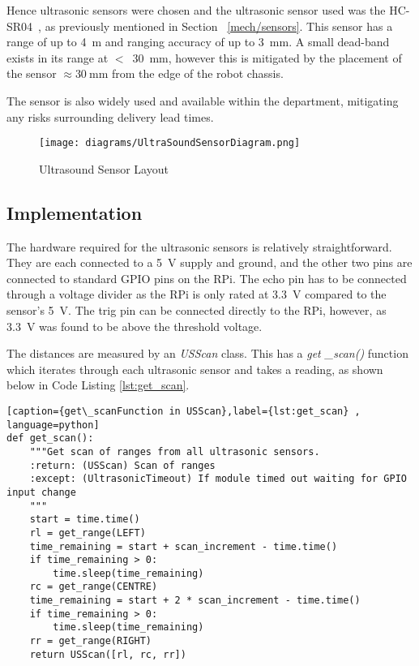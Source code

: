 Hence ultrasonic sensors were chosen and the ultrasonic sensor used was 
the HC-SR04~\cite{HCSR04datasheet}, as previously mentioned in Section~
\ref{mech/sensors}. This sensor has a range of up to \SI{4}{\m} and 
ranging accuracy of up to \SI{3}{\mm}. A small dead-band exists in its 
range at $<$~\SI{30}{\mm}, however this is mitigated by the placement of 
the sensor $\approx{\SI{30}{\mm}}$ from the edge of the robot chassis. 

The sensor is also widely used and available within the 
department, mitigating any risks surrounding delivery lead times. 

\begin{figure}[!ht]
	\centering
	\texttt{[image: diagrams/UltraSoundSensorDiagram.png]}
	\caption{Ultrasound Sensor Layout}\label{UltraSoundSensorDiagram}

\end{figure}

\subsection{Implementation}\label{elec/range/impl}
The hardware required for the ultrasonic sensors is relatively straightforward. 
They are each connected to a \SI{5}{\volt} supply and ground, and the other two pins are 
connected to standard GPIO pins on the RPi. The echo pin has to be connected through 
a voltage divider as the RPi is only rated at \SI{3.3}{\volt} compared to the sensor's \SI{5}{\volt}. The 
trig pin can be connected directly to the RPi, however, as \SI{3.3}{\volt} was found to be above 
the threshold voltage.

The distances are measured by an \textit{USScan} class. This has a \textit{get
\_scan()} function which iterates through each ultrasonic sensor and takes a reading, 
as shown below in Code Listing \ref{lst:get_scan}.

\begin{lstlisting}[caption={get\_scanFunction in USScan},label={lst:get_scan} , language=python]
def get_scan():
    """Get scan of ranges from all ultrasonic sensors.
    :return: (USScan) Scan of ranges
    :except: (UltrasonicTimeout) If module timed out waiting for GPIO input change
    """
    start = time.time()
    rl = get_range(LEFT)
    time_remaining = start + scan_increment - time.time()
    if time_remaining > 0:
        time.sleep(time_remaining)
    rc = get_range(CENTRE)
    time_remaining = start + 2 * scan_increment - time.time()
    if time_remaining > 0:
        time.sleep(time_remaining)
    rr = get_range(RIGHT)
    return USScan([rl, rc, rr])
\end{lstlisting}

